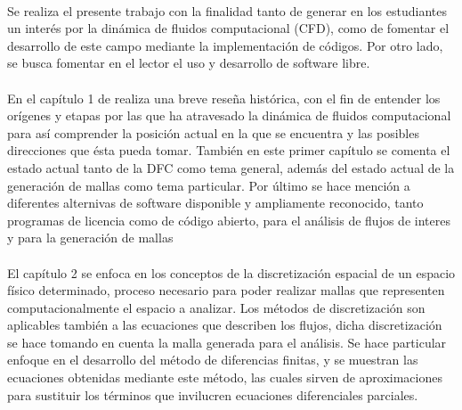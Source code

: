 \documentclass[letterpaper, openright, 12pt]{book}
\begin{document}
    \paragraph*{}
    Se realiza el presente trabajo con la finalidad tanto de generar en los
    estudiantes un interés por la dinámica de fluidos computacional (CFD), como
    de fomentar el desarrollo de este campo mediante la implementación de
    códigos. Por otro lado, se busca fomentar en el lector el uso y desarrollo
    de software libre.

    \paragraph*{}
    En el capítulo 1 de realiza una breve reseña histórica, con el fin de
    entender los orígenes y etapas por las que ha atravesado la dinámica de
    fluidos computacional para así comprender la posición actual en la que se
    encuentra y las posibles direcciones que ésta pueda tomar. También en este
    primer capítulo se comenta el estado actual tanto de la DFC como tema
    general, además del estado actual de la generación de mallas como tema
    particular. Por último se hace mención a diferentes alternivas de software
    disponible y ampliamente reconocido, tanto programas de licencia como de
    código abierto, para el análisis de flujos de interes y para la generación
    de mallas

    \paragraph*{}
    El capítulo 2 se enfoca en los conceptos de la discretización espacial de un
    espacio físico determinado, proceso necesario para poder realizar mallas que
    representen computacionalmente el espacio a analizar. Los métodos de
    discretización son aplicables también a las ecuaciones que describen los
    flujos, dicha discretización se hace tomando en cuenta la malla generada
    para el análisis. Se hace particular enfoque en el desarrollo del método de
    diferencias finitas, y se muestran las ecuaciones obtenidas mediante este
    método, las cuales sirven de aproximaciones para sustituir los términos que
    invilucren ecuaciones diferenciales parciales.
\end{document}
